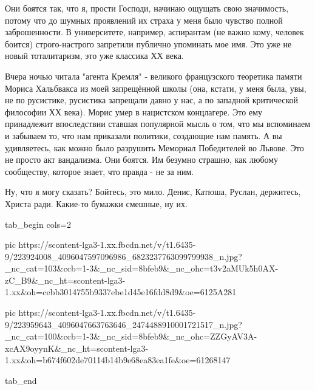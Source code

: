 Они боятся так, что я, прости Господи,
начинаю ощущать свою значимость, потому что до шумных проявлений их страха у
меня было чувство полной заброшенности. В университете, например, аспирантам
(не важно кому, человек боится) строго-настрого запретили публично упоминать
мое имя. Это уже не новый тоталитаризм, это уже классика ХХ века. 

Вчера ночью читала "агента Кремля" - великого французского теоретика памяти
Мориса Хальбвакса из моей запрещённой школы (она, кстати, у меня была, увы, не
по русистике, русистика запрещали давно у нас, а по западной критической
философии ХХ века). Морис умер в нацистском концлагере. Это ему принадлежит
впоследствии ставшая популярной мысль о том, что мы вспоминаем и забываем то,
что нам приказали политики, создающие нам память. А вы удивляетесь, как можно
было разрушить Мемориал Победителей во Львове. Это не просто акт вандализма.
Они боятся. Им безумно страшно, как любому сообществу, которое знает, что
правда - не за ним.

Ну, что я могу сказать? Бойтесь, это мило. Денис, Катюша, Руслан, держитесь,
Христа ради. Какие-то бумажки смешные, ну их.


\ifcmt
  tab_begin cols=2

     pic https://scontent-lga3-1.xx.fbcdn.net/v/t1.6435-9/223924008_4096047597096986_6823237763099799938_n.jpg?_nc_cat=103&ccb=1-3&_nc_sid=8bfeb9&_nc_ohc=t3v2aMUk5h0AX-zC_B9&_nc_ht=scontent-lga3-1.xx&oh=cebb3014755b9337ebe1d45e16fdd8d9&oe=6125A281

     pic https://scontent-lga3-1.xx.fbcdn.net/v/t1.6435-9/223959643_4096047663763646_2474488910001721517_n.jpg?_nc_cat=100&ccb=1-3&_nc_sid=8bfeb9&_nc_ohc=ZZGyAV3A-xcAX9oyynK&_nc_ht=scontent-lga3-1.xx&oh=b674f602de70114b14b9e68ea83ea1fe&oe=61268147

  tab_end
\fi

